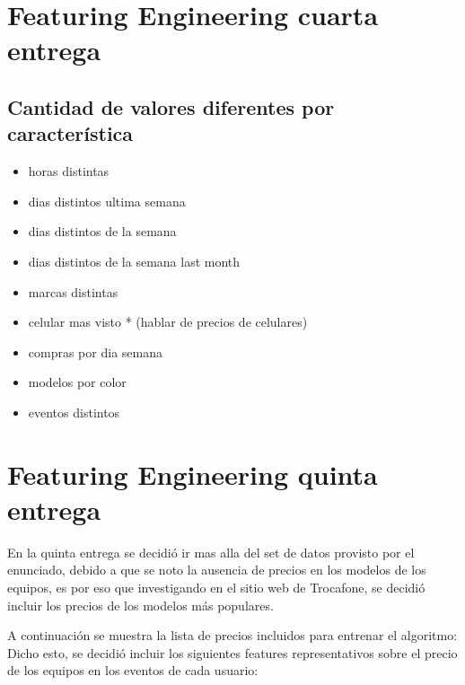 \documentclass[a4paper ,12pt]{article}
\begin{document}
\section{Featuring Engineering cuarta entrega}

\subsection{Cantidad de valores diferentes por característica}

\begin{itemize}
	\item horas distintas

	\item dias distintos ultima semana

	\item dias distintos de la semana

	\item dias distintos de la semana last month

	\item marcas distintas

	\item celular mas visto * (hablar de precios de celulares)

	\item compras por dia semana

	\item modelos por color

	\item eventos distintos

\end{itemize}

\newpage
\section{Featuring Engineering quinta entrega}

En la quinta entrega se decidió ir mas alla del set de datos provisto por el enunciado, debido a que se noto la ausencia de precios en 
los modelos de los equipos, es por eso que investigando en el sitio web de Trocafone, se decidió incluir los precios de los modelos más populares.

A continuación se muestra la lista de precios incluidos para entrenar el algoritmo:
Dicho esto, se decidió incluir los siguientes features representativos sobre el precio de los equipos en los eventos de cada usuario:
\end{document}
